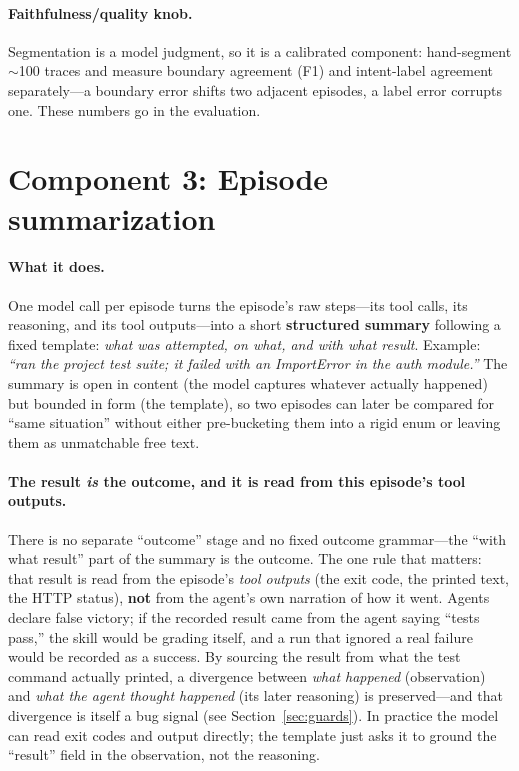 \documentclass[11pt]{article}
\begin{document}
\paragraph{Faithfulness/quality knob.} Segmentation is a model judgment, so it is
a calibrated component: hand-segment $\sim$100 traces and measure boundary
agreement (F1) and intent-label agreement separately---a boundary error shifts
two adjacent episodes, a label error corrupts one. These numbers go in the
evaluation.

\section{Component 3: Episode summarization}
\label{sec:summary}

\paragraph{What it does.} One model call per episode turns the episode's raw
steps---its tool calls, its reasoning, and its tool outputs---into a short
\textbf{structured summary} following a fixed template: \emph{what was attempted,
on what, and with what result}. Example: \emph{``ran the project test suite; it
failed with an ImportError in the auth module.''} The summary is open in content
(the model captures whatever actually happened) but bounded in form (the
template), so two episodes can later be compared for ``same situation'' without
either pre-bucketing them into a rigid enum or leaving them as unmatchable
free text.

\paragraph{The result \emph{is} the outcome, and it is read from this episode's
tool outputs.} There is no separate ``outcome'' stage and no fixed outcome
grammar---the ``with what result'' part of the summary is the outcome. The one
rule that matters: that result is read from the episode's \emph{tool outputs}
(the exit code, the printed text, the HTTP status), \textbf{not} from the agent's
own narration of how it went. Agents declare false victory; if the recorded
result came from the agent saying ``tests pass,'' the skill would be grading
itself, and a run that ignored a real failure would be recorded as a success. By
sourcing the result from what the test command actually printed, a divergence
between \emph{what happened} (observation) and \emph{what the agent thought
happened} (its later reasoning) is preserved---and that divergence is itself a
bug signal (see Section~\ref{sec:guards}). In practice the model can read exit
codes and output directly; the template just asks it to ground the ``result''
field in the observation, not the reasoning.
\end{document}
